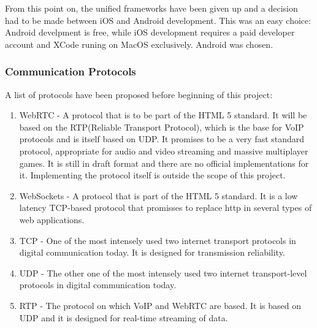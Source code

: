 From this point on, the unified frameworks have been given up and a decision had
to be made between iOS and Android development. This was an easy choice: Android
develpment is free, while iOS development requires a paid developer account and
XCode runing on MacOS exclusively. Android was chosen.


\subsubsection{Communication Protocols}

A list of protocols have been proposed before beginning of this project: 

\begin{enumerate}
	\item WebRTC - A protocol that is to be part of the HTML 5 standard. It will be
	based on the RTP(Reliable Transport Protocol), which is the base for VoIP
	protocols and is itself based on UDP. It promises to be a very fast standard
	protocol, appropriate for audio and video streaming and massive multiplayer
	games.\cite{webrtc} It is still in draft format and there are no official
	implementations for it. Implementing the protocol itself is outside the scope
	of this project.
	\item WebSockets - A protocol that is part of the HTML 5 standard. It is a low
	latency TCP-based protocol that promisses to replace http in several types of
	web applications.\cite{websockets}
	\item TCP - One of the most intensely used two internet transport protocols in
	digital communication today. It is designed for transmission reliability.\cite{tcp}
	\item UDP - The other one of the most intensely used two internet
	transport-level protocols in digital communication today.\cite{udp}
	\item RTP - The protocol on which VoIP and WebRTC are based. It is based on UDP
	and it is designed for real-time streaming of data.\cite{rtp}
\end{enumerate}

